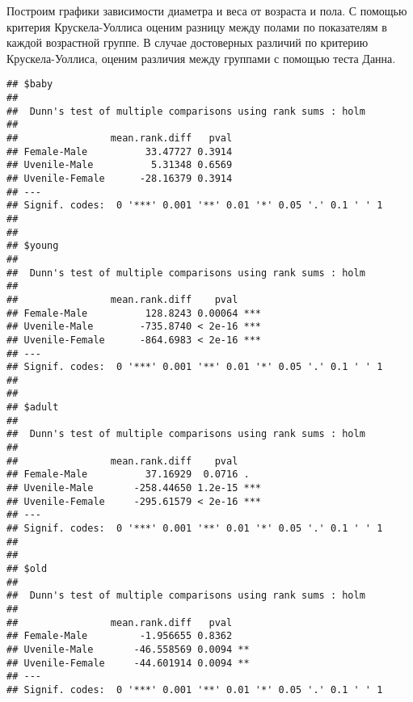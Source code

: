 \documentclass[]{article}
\newenvironment{Shaded}{\begin{snugshade}}{\end{snugshade}}
\newcommand{\ControlFlowTok}[1]{\textcolor[rgb]{0.13,0.29,0.53}{\textbf{#1}}}
\newcommand{\DataTypeTok}[1]{\textcolor[rgb]{0.13,0.29,0.53}{#1}}
\newcommand{\KeywordTok}[1]{\textcolor[rgb]{0.13,0.29,0.53}{\textbf{#1}}}
\newcommand{\NormalTok}[1]{#1}
\newcommand{\OperatorTok}[1]{\textcolor[rgb]{0.81,0.36,0.00}{\textbf{#1}}}
\newcommand{\StringTok}[1]{\textcolor[rgb]{0.31,0.60,0.02}{#1}}
\begin{document}
Построим графики зависимости диаметра и веса от возраста и пола. С
помощью критерия Крускела-Уоллиса оценим разницу между полами по
показателям в каждой возрастной группе. В случае достоверных различий по
критерию Крускела-Уоллиса, оценим различия между группами с помощью
теста Данна.

\begin{Shaded}
\end{Shaded}

\begin{verbatim}
## $baby
## 
##  Dunn's test of multiple comparisons using rank sums : holm  
## 
##                mean.rank.diff   pval    
## Female-Male          33.47727 0.3914    
## Uvenile-Male          5.31348 0.6569    
## Uvenile-Female      -28.16379 0.3914    
## ---
## Signif. codes:  0 '***' 0.001 '**' 0.01 '*' 0.05 '.' 0.1 ' ' 1
## 
## 
## $young
## 
##  Dunn's test of multiple comparisons using rank sums : holm  
## 
##                mean.rank.diff    pval    
## Female-Male          128.8243 0.00064 ***
## Uvenile-Male        -735.8740 < 2e-16 ***
## Uvenile-Female      -864.6983 < 2e-16 ***
## ---
## Signif. codes:  0 '***' 0.001 '**' 0.01 '*' 0.05 '.' 0.1 ' ' 1
## 
## 
## $adult
## 
##  Dunn's test of multiple comparisons using rank sums : holm  
## 
##                mean.rank.diff    pval    
## Female-Male          37.16929  0.0716 .  
## Uvenile-Male       -258.44650 1.2e-15 ***
## Uvenile-Female     -295.61579 < 2e-16 ***
## ---
## Signif. codes:  0 '***' 0.001 '**' 0.01 '*' 0.05 '.' 0.1 ' ' 1
## 
## 
## $old
## 
##  Dunn's test of multiple comparisons using rank sums : holm  
## 
##                mean.rank.diff   pval    
## Female-Male         -1.956655 0.8362    
## Uvenile-Male       -46.558569 0.0094 ** 
## Uvenile-Female     -44.601914 0.0094 ** 
## ---
## Signif. codes:  0 '***' 0.001 '**' 0.01 '*' 0.05 '.' 0.1 ' ' 1
\end{verbatim}
\end{document}
